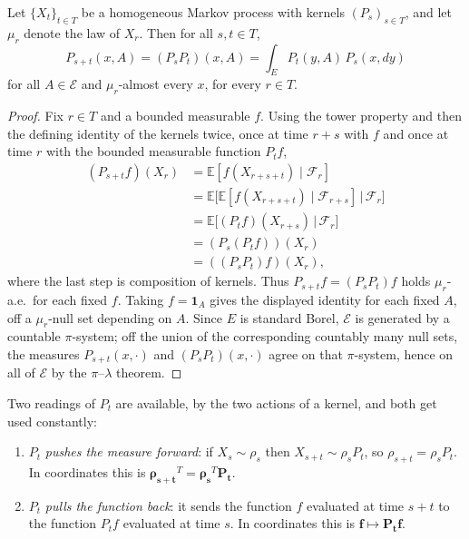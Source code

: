 	\begin{lemma}
		\label{thm:chapman-kolmogorov-equation}
		Let $\{X_t\}_{t \in T}$ be a homogeneous Markov process with kernels $(P_s)_{s \in T}$, and let $\mu_r$ denote the law of $X_r$. Then for all $s, t \in T$,
		\begin{equation}
			P_{s+t}(x, A) = (P_s P_t)(x, A) = \int_E P_t(y, A) \, P_s(x, dy)
		\end{equation}
		for all $A \in \mathcal{E}$ and $\mu_r$-almost every $x$, for every $r \in T$. 
	\end{lemma}
	\begin{proof}
		Fix $r \in T$ and a bounded measurable $f$. Using the tower property and then the defining identity of the kernels twice, once at time $r + s$ with $f$ and once at time $r$ with the bounded measurable function $P_t f$,
		\begin{align*}
			(P_{s+t} f)(X_r) & = \mathbb{E}[f(X_{r+s+t}) \mid \mathcal{F}_r] \\
			& = \mathbb{E}\big[ \mathbb{E}[f(X_{r+s+t}) \mid \mathcal{F}_{r+s}] \,\big|\, \mathcal{F}_r \big] \\
			& = \mathbb{E}\big[ (P_t f)(X_{r+s}) \,\big|\, \mathcal{F}_r \big] \\
			& = (P_s (P_t f))(X_r) \\
			& = ((P_s P_t) f)(X_r),
		\end{align*}
		where the last step is composition of kernels. Thus $P_{s+t} f = (P_s P_t) f$ holds $\mu_r$-a.e.\ for each fixed $f$. Taking $f = \mathbf{1}_A$ gives the displayed identity for each fixed $A$, off a $\mu_r$-null set depending on $A$. Since $E$ is standard Borel, $\mathcal{E}$ is generated by a countable $\pi$-system; off the union of the corresponding countably many null sets, the measures $P_{s+t}(x, \cdot)$ and $(P_s P_t)(x, \cdot)$ agree on that $\pi$-system, hence on all of $\mathcal{E}$ by the $\pi$--$\lambda$ theorem.
	\end{proof}

	Two readings of $P_t$ are available, by the two actions of a kernel, and both get used constantly:

	\begin{enumerate}
		\item $P_t$ \textit{pushes the measure forward}: if $X_s \sim \rho_s$ then $X_{s+t} \sim \rho_s P_t$, so $\rho_{s+t} = \rho_s P_t$. In coordinates this is $\boldsymbol{\rho_{s+t}}^T = \boldsymbol{\rho_s}^T \mathbf{P_t}$.

		\item $P_t$ \textit{pulls the function back}: it sends the function $f$ evaluated at time $s + t$ to the function $P_t f$ evaluated at time $s$. In coordinates this is $\mathbf{f} \mapsto \mathbf{P_t} \mathbf{f}$.
	\end{enumerate}

